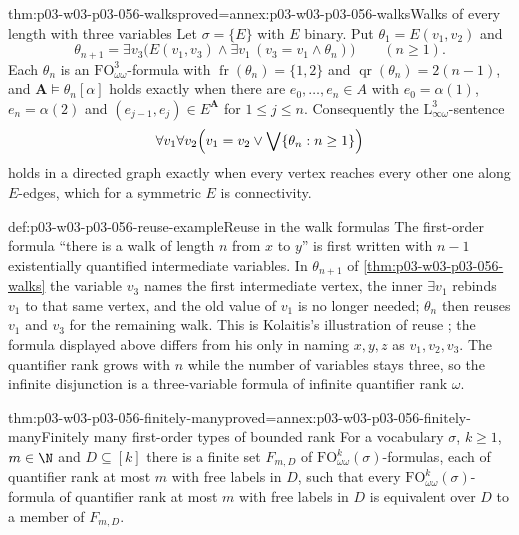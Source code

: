 \begin{hblemma}{thm:p03-w03-p03-056-walks}{proved=annex:p03-w03-p03-056-walks}{Walks of every length with three variables}
Let \(\sigma=\{E\}\) with \(E\) binary. Put
\(\theta_1=E(v_1,v_2)\) and
\[
 \theta_{n+1}=\exists v_3\bigl(E(v_1,v_3)\land
   \exists v_1\,(v_3=v_1\land\theta_n)\bigr)\qquad(n\geq1).
\]
Each \(\theta_n\) is an \(\mathrm{FO}^3_{\omega\omega}\)-formula with
\(\operatorname{fr}(\theta_n)=\{1,2\}\) and
\(\operatorname{qr}(\theta_n)=2(n-1)\), and
\(\mathbf A\models\theta_n[\alpha]\) holds exactly when there are
\(e_0,\ldots,e_n\in A\) with \(e_0=\alpha(1)\), \(e_n=\alpha(2)\) and
\((e_{j-1},e_j)\in E^{\mathbf A}\) for \(1\leq j\leq n\). Consequently the
\(\mathrm{L}^3_{\infty\omega}\)-sentence
\[
 \forall v_1\forall v_2\Bigl(v_1=v_2\lor\bigvee\{\theta_n:n\geq1\}\Bigr)
\]
holds in a directed graph exactly when every vertex reaches every other one
along \(E\)-edges, which for a symmetric \(E\) is connectivity.
\end{hblemma}

\begin{hbexample}{def:p03-w03-p03-056-reuse-example}{Reuse in the walk formulas}
The first-order formula ``there is a walk of length \(n\) from \(x\) to
\(y\)'' is first written with \(n-1\) existentially quantified intermediate
variables. In \(\theta_{n+1}\) of \cref{thm:p03-w03-p03-056-walks} the
variable \(v_3\) names the first intermediate vertex, the inner
\(\exists v_1\) rebinds \(v_1\) to that same vertex, and the old value of
\(v_1\) is no longer needed; \(\theta_n\) then reuses \(v_1\) and \(v_3\)
for the remaining walk. This is Kolaitis's illustration of reuse
\cite[pp.~53--54]{Kolaitis2003ExpressivePowerNotes}; the formula
displayed above differs from his only in naming \(x,y,z\) as
\(v_1,v_2,v_3\). The quantifier rank grows with \(n\) while the number of
variables stays three, so the infinite disjunction is a three-variable
formula of infinite quantifier rank \(\omega\).
\end{hbexample}

\begin{hblemma}{thm:p03-w03-p03-056-finitely-many}{proved=annex:p03-w03-p03-056-finitely-many}{Finitely many first-order types of bounded rank}
For a vocabulary \(\sigma\), \(k\geq1\), \(m\in\N\) and \(D\subseteq[k]\)
there is a finite set \(F_{m,D}\) of
\(\mathrm{FO}^k_{\omega\omega}(\sigma)\)-formulas, each of quantifier rank
at most \(m\) with free labels in \(D\), such that every
\(\mathrm{FO}^k_{\omega\omega}(\sigma)\)-formula of quantifier rank at most
\(m\) with free labels in \(D\) is equivalent over \(D\) to a member of
\(F_{m,D}\).
\end{hblemma}

